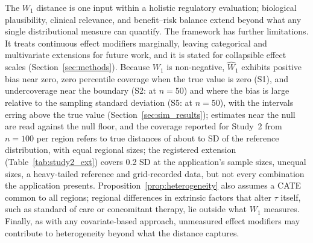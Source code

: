 \documentclass[AMA,Times1COL]{WileyNJDv5}
\begin{document}
The $W_1$ distance is one input within a holistic regulatory evaluation; biological plausibility, clinical relevance, and benefit--risk balance extend beyond what any single distributional measure can quantify.\cite{iche17,matsushima2024} The framework has further limitations. It treats continuous effect modifiers marginally, leaving categorical and multivariate extensions for future work, and it is stated for collapsible effect scales (Section~\ref{sec:methods}). Because $W_1$ is non-negative, $\widehat{W}_1$ exhibits positive bias near zero, zero percentile coverage when the true value is zero (S1), and undercoverage near the boundary (S2:  at $n = 50$) and where the bias is large relative to the sampling standard deviation (S5:  at $n = 50$), with the intervals erring above the true value (Section~\ref{sec:sim_results});\cite{andrews2000} estimates near the null are read against the null floor, and the coverage reported for Study~2 from $n = 100$ per region refers to true distances of about  to  SD of the reference distribution, with equal regional sizes; the registered extension (Table~\ref{tab:study2_ext}) covers 0.2 SD at the application's sample sizes, unequal sizes, a heavy-tailed reference and grid-recorded data, but not every combination the application presents. Proposition~\ref{prop:heterogeneity} also assumes a CATE common to all regions; regional differences in extrinsic factors that alter $\tau$ itself, such as standard of care or concomitant therapy, lie outside what $W_1$ measures. Finally, as with any covariate-based approach, unmeasured effect modifiers may contribute to heterogeneity beyond what the distance captures.
\end{document}
